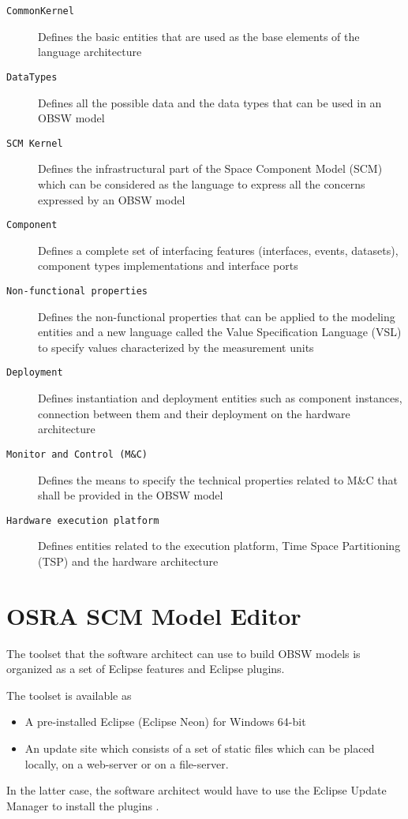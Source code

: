 \begin{description}
\item [\texttt{CommonKernel}] Defines the basic entities that are used as the base elements of the language architecture
\item [\texttt{DataTypes}] Defines all the possible data and the data types that can be used in an OBSW model
\item [\texttt{SCM Kernel}] Defines the infrastructural part of the Space Component Model (SCM) which can be considered as the language to express all the concerns expressed by an OBSW model
\item [\texttt{Component}] Defines a complete set of interfacing features (interfaces, events, datasets), component types implementations and interface ports
\item [\texttt{Non-functional properties}] Defines the non-functional properties that can be applied to the modeling entities and a new language called the Value Specification Language (VSL) to specify values characterized by the measurement units
\item [\texttt{Deployment}] Defines instantiation and deployment entities such as component instances, connection between them and their deployment on the hardware architecture
\item [\texttt{Monitor and Control (M\&C)}] Defines the means to specify the technical properties related to M\&C that shall be provided in the OBSW model
\item [\texttt{Hardware execution platform}] Defines entities related to the execution platform, Time Space Partitioning (TSP) and the hardware architecture   
\end{description}

\section{OSRA SCM Model Editor}
\label{section: OSRA editor} 
The toolset that the software architect can use to build OBSW models is organized as a set of Eclipse features and Eclipse plugins. 

The toolset is available as
\begin{itemize}
\item A pre-installed Eclipse (Eclipse Neon) for Windows 64-bit  
\item An update site which consists of a set of static files which can be placed locally, on a web-server or on a file-server. 
\end{itemize}
In the latter case, the software architect would have to use the Eclipse Update Manager to install the plugins \cite{OSRAEditor}. 

